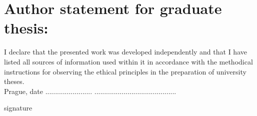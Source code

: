 \chapter*{Author statement for graduate thesis:}

I declare that the presented work was developed independently and that I have listed all sources of information used within it in accordance with the methodical instructions for observing the ethical principles in the preparation of university theses.\\

\noindent Prague, date ........................ \hfill ..........................................
\noindent \begin{flushright}
signature
\end{flushright}